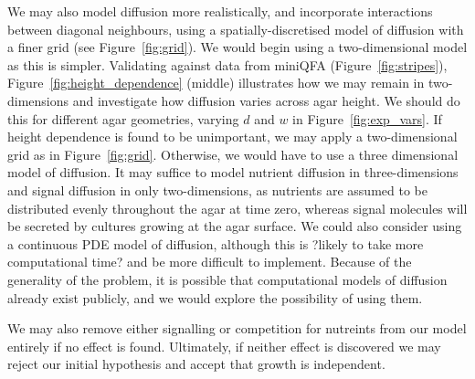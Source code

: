 We may also model diffusion more realistically, and incorporate
interactions between diagonal neighbours, using a
spatially-discretised model of diffusion with a finer grid (see
Figure~\ref{fig:grid}). We would begin using a two-dimensional model as
this is simpler. Validating against data from miniQFA
(Figure~\ref{fig:stripes}), Figure~\ref{fig:height_dependence}
(middle) illustrates how we may remain in two-dimensions and
investigate how diffusion varies across agar height. We should do this
for different agar geometries, varying \(d\) and \(w\) in
Figure~\ref{fig:exp_vars}. If height dependence is found to be
unimportant, we may apply a two-dimensional grid as in
Figure~\ref{fig:grid}. Otherwise, we would have to use a three
dimensional model of diffusion. It may suffice to model nutrient
diffusion in three-dimensions and signal diffusion in only
two-dimensions, as nutrients are assumed to be distributed evenly
throughout the agar at time zero, whereas signal molecules will be
secreted by cultures growing at the agar surface. We could also
consider using a continuous PDE model of diffusion, although this is
?likely to take more computational time? and be more difficult to
implement. Because of the generality of the problem, it is
possible that computational models of diffusion already exist
publicly, and we would explore the possibility of using them.

We may also remove either signalling or competition for nutreints from
our model entirely if no effect is found. Ultimately, if neither effect
is discovered we may reject our initial hypothesis and accept that
growth is independent.


